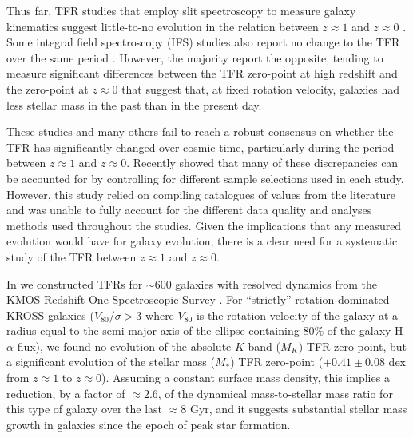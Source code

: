 \documentclass[a4paper,fleqn,usenatbib]{mnras}
\begin{document}
Thus far, TFR studies that employ slit spectroscopy to measure galaxy kinematics suggest little-to-no evolution in the relation between $z\approx1$ and $z\approx0$ \citep[e.g.][]{Conselice:2005b,Kassin:2007a,Miller:2011,Miller:2012}. Some integral field spectroscopy (IFS) studies also report no change to the TFR over the same period \citep[e.g.][]{Flores:2006}. However, the majority report the opposite, tending to measure significant differences between the TFR zero-point at high redshift and the zero-point at $z\approx0$ \citep[e.g.][]{Puech:2008,Cresci:2009,Gnerucci:2011,Tiley:2016,Ubler:2017} that suggest that, at fixed rotation velocity, galaxies had less stellar mass in the past than in the present day. 

These studies and many others \citep[e.g.][]{Maiolino:2008a,ForsterSchreiber:2009,Mannucci:2009,Contini:2012,Swinbank:2012b,Sobral:2013} fail to reach a robust consensus on whether the TFR has significantly changed over cosmic time, particularly during the period between $z\approx1$ and $z\approx0$. Recently \citet{Turner:2017b} showed that many of these discrepancies can be accounted for by controlling for different sample selections used in each study. However, this study relied on compiling catalogues of values from the literature and was unable to fully account for the different data quality and analyses methods used throughout the studies. Given the implications that any measured evolution would have for galaxy evolution, there is a clear need for a systematic study of the TFR between $z\approx1$ and $z\approx0$.

In \citet{Tiley:2016} we constructed TFRs for $\sim$600 galaxies with resolved dynamics from the KMOS Redshift One Spectroscopic Survey \citep[KROSS;][]{Stott:2016,Harrison:2017}. For ``strictly'' rotation-dominated KROSS galaxies ($V_{80}/\sigma > 3$ where $V_{80}$ is the rotation velocity of the galaxy at a radius equal to the semi-major axis of the ellipse containing 80\% of the galaxy H$\alpha$ flux), we found no evolution of the absolute $K$-band ($M_{K}$) TFR zero-point, but a significant evolution of the stellar mass ($M_{*}$) TFR zero-point ($+0.41 \pm 0.08$ dex from $z\approx1$ to $z\approx0$). Assuming a constant surface mass density, this implies a reduction, by a factor of $\approx2.6$, of the dynamical mass-to-stellar mass ratio for this type of galaxy over the last $\approx 8$ Gyr, and it suggests substantial stellar mass growth in galaxies since the epoch of peak star formation.
\end{document}
